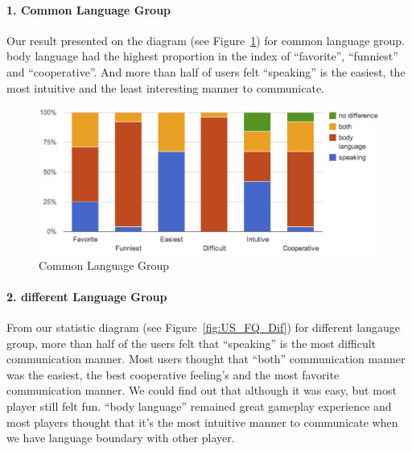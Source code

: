 \paragraph{1. Common Language Group}
Our result presented on the diagram (see Figure~\ref{fig:US_FQ_Com}) for common language group. 
body language had the highest proportion in the index of ``favorite'', ``funniest'' and ``cooperative''.
And more than half of users felt ``speaking'' is the easiest, the most intuitive and the least interesting manner to communicate.

\begin{figure}[!h]
\centering
\includegraphics[width=0.9\columnwidth]{Figures/US_FQ_Com.png}
\caption{Common Language Group}
\label{fig:US_FQ_Com}
\end{figure}

\paragraph{2. different Language Group}
From our statistic diagram (see Figure~\ref{fig:US_FQ_Dif}) for different langauge group, more than half of the users felt that ``speaking'' is the most difficult communication manner.
Most users thought that ``both'' communication manner was the easiest, the best cooperative feeling's and the most favorite communication manner. We could find out that although it was easy, but most player still felt fun. ``body language'' remained great gameplay experience and most players thought that it's the most intuitive manner to communicate when we have language boundary with other player.

